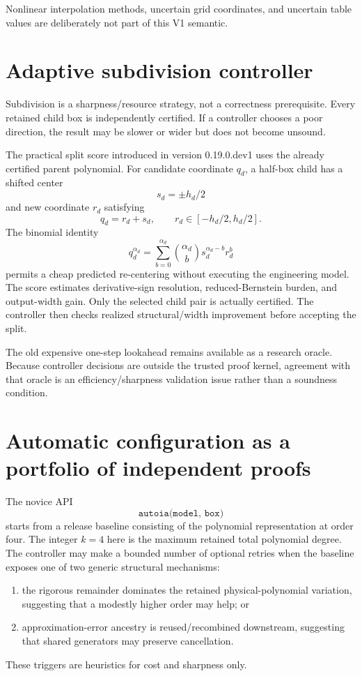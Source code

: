 \documentclass[11pt]{article}
\begin{document}
Nonlinear interpolation methods, uncertain grid coordinates, and uncertain table
values are deliberately not part of this V1 semantic.


\section{Adaptive subdivision controller}

Subdivision is a sharpness/resource strategy, not a correctness prerequisite.
Every retained child box is independently certified.  If a controller chooses a
poor direction, the result may be slower or wider but does not become unsound.

The practical split score introduced in version 0.19.0.dev1 uses the already
certified parent polynomial.  For candidate coordinate \(q_d\), a half-box child
has a shifted center
\[
  s_d=\pm h_d/2
\]
and new coordinate \(r_d\) satisfying
\[
  q_d=r_d+s_d,
  \qquad
  r_d\in[-h_d/2,h_d/2].
\]
The binomial identity
\[
  q_d^{\alpha_d}
  =\sum_{b=0}^{\alpha_d}
    {\alpha_d\choose b}s_d^{\alpha_d-b}r_d^b
\]
permits a cheap predicted re-centering without executing the engineering model.
The score estimates derivative-sign resolution, reduced-Bernstein burden, and
output-width gain.  Only the selected child pair is actually certified.  The
controller then checks realized structural/width improvement before accepting
the split.

The old expensive one-step lookahead remains available as a research oracle.
Because controller decisions are outside the trusted proof kernel, agreement with
that oracle is an efficiency/sharpness validation issue rather than a soundness
condition.

\section{Automatic configuration as a portfolio of independent proofs}

The novice API
\[
  \texttt{autoia(model, box)}
\]
starts from a release baseline consisting of the polynomial representation at
order four.  The integer \(k=4\) here is the maximum retained total polynomial
degree.  The controller may make a bounded number of optional retries when the
baseline exposes one of two generic structural mechanisms:
\begin{enumerate}[leftmargin=*]
\item the rigorous remainder dominates the retained physical-polynomial
variation, suggesting that a modestly higher order may help; or
\item approximation-error ancestry is reused/recombined downstream, suggesting
that shared generators may preserve cancellation.
\end{enumerate}
These triggers are heuristics for cost and sharpness only.
\end{document}
